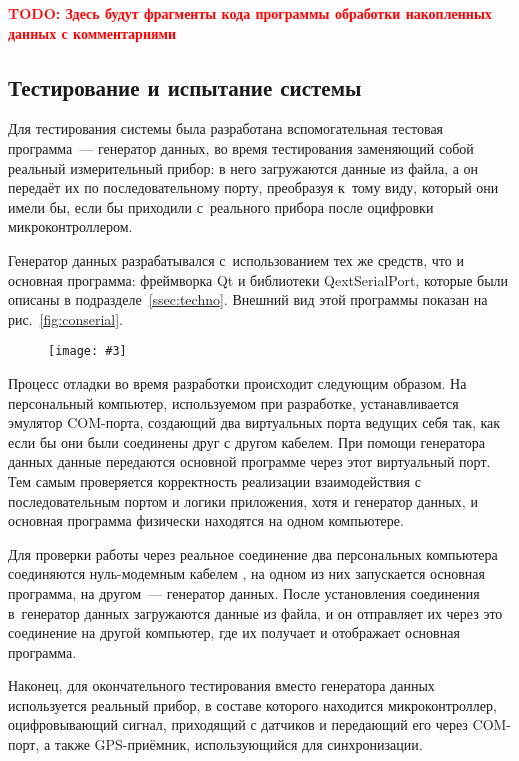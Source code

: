 \documentclass[a4paper, 14pt, titlepage]{extarticle}
\newcommand{\todo}[1]{\textbf{\textcolor{red}{TODO: #1}}}
\newenvironment{myfigure}[2]%
    {\pushQED{\caption{#1} \label{#2}} %
     \begin{figure}[!htb]\centering } %
    {  \popQED %
     \end{figure}}
\newcommand{\includefigure}[3][]{
    \begin{myfigure}{#2}{fig:#3}
      \texttt{[image: \#3]}
    \end{myfigure}
  }
\begin{document}
  \todo{Здесь будут фрагменты кода программы обработки накопленных данных с комментариями}

  \subsection{Тестирование и испытание системы}\label{ssec:testing}

  Для тестирования системы была разработана вспомогательная тестовая программа~--- генератор данных,
  во время тестирования заменяющий собой реальный измерительный прибор: в него загружаются данные из
  файла, а он передаёт их по последовательному порту, преобразуя к~тому виду, который они имели бы,
  если бы приходили с~реального прибора после оцифровки микроконтроллером.

  Генератор данных разрабатывался с~использованием тех же средств, что и основная программа:
  фреймворка Qt и библиотеки QextSerialPort, которые были описаны в подразделе~\ref{ssec:techno}.
  Внешний вид этой программы показан на рис.~\ref{fig:conserial}.

  \includefigure[width=0.4\textwidth]{Тестовая программа~--- генератор данных}{conserial}

  Процесс отладки во время разработки происходит следующим образом. На персональный компьютер,
  используемом при разработке, устанавливается эмулятор COM-порта, создающий два виртуальных порта
  ведущих себя так, как если бы они были соединены друг с другом кабелем. При помощи генератора
  данных данные передаются основной программе через этот виртуальный порт. Тем самым проверяется
  корректность реализации взаимодействия с последовательным портом и логики приложения, хотя и
  генератор данных, и основная программа физически находятся на одном компьютере.

  Для проверки работы через реальное соединение два персональных компьютера
  соединяются нуль-модемным кабелем \cite{null-modem}, на одном из них запускается основная
  программа, на другом~--- генератор данных. После установления соединения в~генератор данных
  загружаются данные из файла, и он отправляет их через это соединение на другой компьютер, где их
  получает и отображает основная программа.

  Наконец, для окончательного тестирования вместо генератора данных используется реальный прибор, в
  составе которого находится микроконтроллер, оцифровывающий сигнал, приходящий с датчиков и
  передающий его через COM-порт, а также GPS-приёмник, использующийся для синхронизации.
\end{document}
